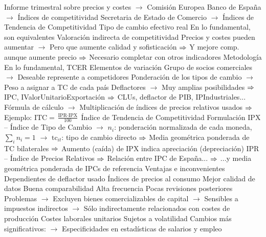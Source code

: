 \documentclass{nuevotema}
\begin{document}
\begin{esquemal}
				\4[] Informe trimestral sobre precios y costes
				\4[] $\to$ Comisión Europea
				\4[] Banco de España
				\4[] $\to$ Índices de competitividad
				\4[] Secretaria de Estado de Comercio
				\4[] $\to$ Índices de Tendencia de Competitividad
				\4 Tipo de cambio efectivo real
				\4[] En lo fundamental, son equivalentes
				\4 Valoración indirecta de competitividad
				\4[] Precios y costes pueden aumentar
				\4[] $\to$ Pero que aumente calidad y sofisticación
				\4[] $\Rightarrow$ Y mejore comp. aunque aumente precio
				\4[] $\Rightarrow$ Necesario completar con otros indicadores
			\3 Metodología
				\4 En lo fundamental, TCER
				\4 Elementos de variación
				\4[] Grupo de socios comerciales
				\4[] $\to$ Deseable represente a competidores
				\4[] Ponderación de los tipos de cambio
				\4[] $\to$ Peso a asignar a TC de cada país
				\4[] Deflactores
				\4[] $\to$ Muy amplias posibilidades
				\4[] $\Rightarrow$ IPC, IValorUnitarioExportación
				\4[] $\Rightarrow$ CLUs, deflactor de PIB, IPIndustriales...
				\4[] Fórmula de cálculo
				\4[] $\to$ Multiplicación de índices de precios relativos usados
				\4[] $\Rightarrow$ Ejemplo: $\text{ITC} = \frac{\text{IPR} \cdot \text{IPX}}{100}$
			\3 Índice de Tendencia de Competitividad
				\4 Formulación
				\4[] 
				\4 IPX -- Índice de Tipo de Cambio
				\4[] 
				\4[] $\to$ $n_i$: ponderación normalizada de cada moneda, $\sum_i n_i = 1$
				\4[] $\to$ $\text{tc}_{it}$: tipo de cambio directo
				\4[] $\Rightarrow$ Media geométrica ponderada de TC bilaterales
				\4[] $\Rightarrow$ Aumento (caída) de IPX indica apreciación (depreciación)
				\4 IPR -- Índice de Precios Relativos
				\4[] 
				\4[] $\Rightarrow$ Relación entre IPC de España...
				\4[] $\Rightarrow$ ...y media geométrica ponderada de IPCs de referencia
			\3 Ventajas e inconvenientes
				\4 Dependientes de deflactor usado
				\4 Índices de precios al consumo
				\4[] Mejor calidad de datos
				\4[] Buena comparabilidad
				\4[] Alta frecuencia
				\4[] Pocas revisiones posteriores
				\4[] Problemas
				\4[] $\to$ Excluyen bienes comercializables de capital
				\4[] $\to$ Sensibles a impuestos indirectos
				\4[] $\to$ Sólo indirectamente relacionados con costes de producción
				\4 Costes laborales unitarios
				\4[] Sujetos a volatilidad
				\4[] Cambios más significativos:
				\4[] $\to$ Especificidades en estadísticas de salarios y empleo

\end{esquemal}
\end{document}

